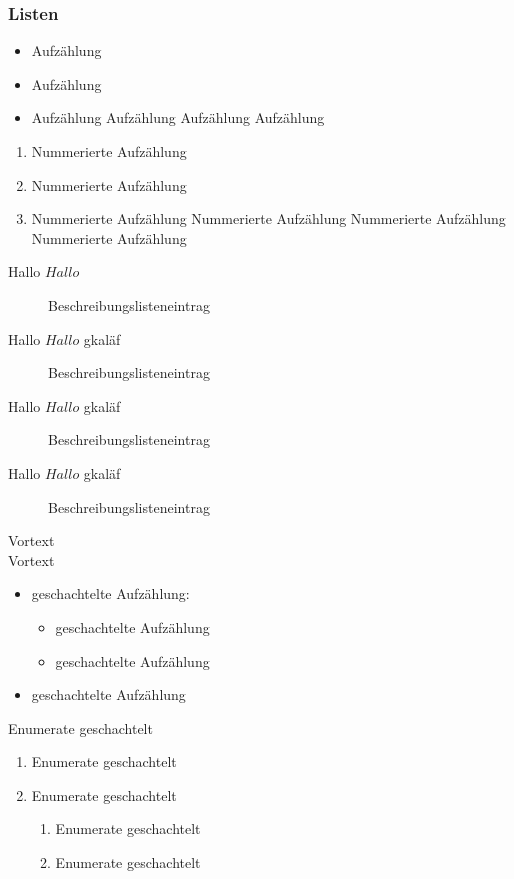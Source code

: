 \documentclass[english,ngerman]{book}%
\theoremstyle{dgdef}
\theoremstyle{dgthm}
\begin{document}
\subsubsection{Listen}

\begin{itemize}
\item Aufzählung
\item Aufzählung
\item Aufzählung Aufzählung Aufzählung Aufzählung
\end{itemize}

\begin{enumerate}
\item Nummerierte Aufzählung
\item Nummerierte Aufzählung
\item Nummerierte Aufzählung Nummerierte Aufzählung Nummerierte Aufzählung Nummerierte Aufzählung
\end{enumerate}

\begin{description}
\item[Hallo $Hallo$] Beschreibungslisteneintrag
\item[Hallo $Hallo$ gkaläf] Beschreibungslisteneintrag
\item[Hallo $Hallo$ gkaläf] Beschreibungslisteneintrag
\item[Hallo $Hallo$ gkaläf] Beschreibungslisteneintrag
\end{description}


Vortext\\
Vortext
\begin{itemize}
\item geschachtelte Aufzählung:
  \begin{itemize}
  \item geschachtelte Aufzählung
  \item geschachtelte Aufzählung
  \end{itemize}
\item geschachtelte Aufzählung
\end{itemize}

Enumerate geschachtelt
\begin{enumerate}
\item Enumerate geschachtelt\cite{Bourbaki1}
\item Enumerate geschachtelt\cite{Bourbaki2}
\begin{enumerate}
\item Enumerate geschachtelt
\item Enumerate geschachtelt
\end{enumerate}
\end{enumerate}
\end{document}
